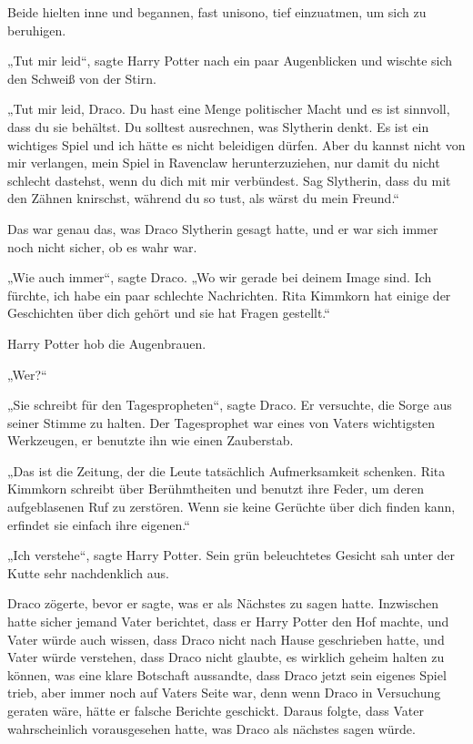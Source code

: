 {Beide hielten inne und begannen, fast unisono, tief einzuatmen, um sich zu beruhigen.

„Tut mir leid“, sagte Harry Potter nach ein paar Augenblicken und wischte sich den Schweiß von der Stirn.

„Tut mir leid, Draco. Du hast eine Menge politischer Macht und es ist sinnvoll, dass du sie behältst. Du solltest ausrechnen, was Slytherin denkt. Es ist ein wichtiges Spiel und ich hätte es nicht beleidigen dürfen. Aber du kannst nicht von mir verlangen, mein Spiel in Ravenclaw herunterzuziehen, nur damit du nicht schlecht dastehst, wenn du dich mit mir verbündest. Sag Slytherin, dass du mit den Zähnen knirschst, während du so tust, als wärst du mein Freund.“

Das war genau das, was Draco Slytherin gesagt hatte, und er war sich immer noch nicht sicher, ob es wahr war.

„Wie auch immer“, sagte Draco. „Wo wir gerade bei deinem Image sind. Ich fürchte, ich habe ein paar schlechte Nachrichten. Rita Kimmkorn hat einige der Geschichten über dich gehört und sie hat Fragen gestellt.“

Harry Potter hob die Augenbrauen.

„Wer?“

„Sie schreibt für den Tagespropheten“, sagte Draco. Er versuchte, die Sorge aus seiner Stimme zu halten. Der Tagesprophet war eines von Vaters wichtigsten Werkzeugen, er benutzte ihn wie einen Zauberstab.

„Das ist die Zeitung, der die Leute tatsächlich Aufmerksamkeit schenken. Rita Kimmkorn schreibt über Berühmtheiten und benutzt ihre Feder, um deren aufgeblasenen Ruf zu zerstören. Wenn sie keine Gerüchte über dich finden kann, erfindet sie einfach ihre eigenen.“

„Ich verstehe“, sagte Harry Potter. Sein grün beleuchtetes Gesicht sah unter der Kutte sehr nachdenklich aus.

Draco zögerte, bevor er sagte, was er als Nächstes zu sagen hatte. Inzwischen hatte sicher jemand Vater berichtet, dass er Harry Potter den Hof machte, und Vater würde auch wissen, dass Draco nicht nach Hause geschrieben hatte, und Vater würde verstehen, dass Draco nicht glaubte, es wirklich geheim halten zu können, was eine klare Botschaft aussandte, dass Draco jetzt sein eigenes Spiel trieb, aber immer noch auf Vaters Seite war, denn wenn Draco in Versuchung geraten wäre, hätte er falsche Berichte geschickt. Daraus folgte, dass Vater wahrscheinlich vorausgesehen hatte, was Draco als nächstes sagen würde.

}

